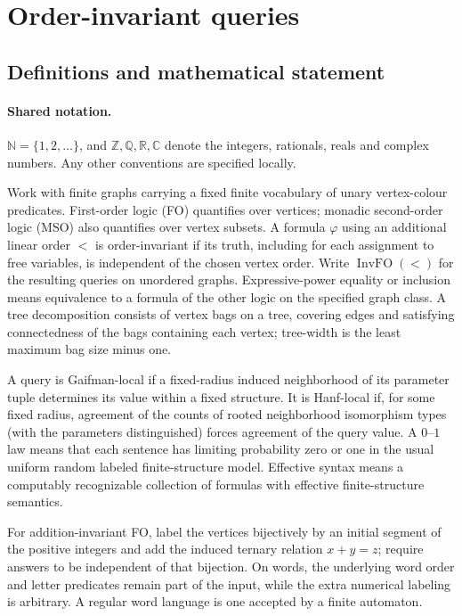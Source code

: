 \documentclass[11pt]{article}
\begin{document}
\section{Order-invariant queries}\label{statement}

\subsection{Definitions and mathematical statement}

\paragraph{Shared notation.}$\mathbb N=\{1,2,\ldots\}$, and $\mathbb Z,\mathbb Q,\mathbb R,\mathbb C$ denote the integers, rationals, reals and complex numbers. Any other conventions are specified locally.


Work with finite graphs carrying a fixed finite vocabulary of unary vertex-colour predicates. First-order logic (FO) quantifies over vertices; monadic second-order logic (MSO) also quantifies over vertex subsets. A formula $\varphi$ using an additional linear order $<$ is order-invariant if its truth, including for each assignment to free variables, is independent of the chosen vertex order. Write $\operatorname{InvFO}(<)$ for the resulting queries on unordered graphs. Expressive-power equality or inclusion means equivalence to a formula of the other logic on the specified graph class. A tree decomposition consists of vertex bags on a tree, covering edges and satisfying connectedness of the bags containing each vertex; tree-width is the least maximum bag size minus one.\par
A query is Gaifman-local if a fixed-radius induced neighborhood of its parameter tuple determines its value within a fixed structure. It is Hanf-local if, for some fixed radius, agreement of the counts of rooted neighborhood isomorphism types (with the parameters distinguished) forces agreement of the query value. A $0$--$1$ law means that each sentence has limiting probability zero or one in the usual uniform random labeled finite-structure model. Effective syntax means a computably recognizable collection of formulas with effective finite-structure semantics.\par
For addition-invariant FO, label the vertices bijectively by an initial segment of the positive integers and add the induced ternary relation $x+y=z$; require answers to be independent of that bijection. On words, the underlying word order and letter predicates remain part of the input, while the extra numerical labeling is arbitrary. A regular word language is one accepted by a finite automaton.
\end{document}
